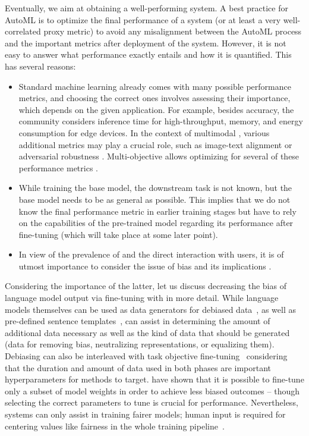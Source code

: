 Eventually, we aim at obtaining a well-performing \LLM system. A best practice for AutoML is to optimize the final performance of a system (or at least a very well-correlated proxy metric) to avoid any misalignment between the AutoML process and the important metrics after deployment of the system. However, it is not easy to answer what performance exactly entails and how it is quantified. This has several reasons: \begin{itemize}[(i)]
    \item Standard machine learning already comes with many possible performance metrics, and choosing the correct ones involves assessing their importance, which depends on the given application. For example, besides accuracy, the community considers inference time for high-throughput, memory, and energy consumption for edge devices. In the context of multimodal \LLMs, various additional metrics may play a crucial role, such as image-text alignment \cite{xu-cvpr18a, grimal-arxiv2023a} or adversarial robustness \cite{zhao-neurips23a}. Multi-objective \AutoML allows optimizing for several of these performance metrics \cite{moraleshernandez-arxiv21a,karl-evolearn23a}.
    \item While training the base model, the downstream task is not known, but the base model needs to be as general as possible. This implies that we do not know the final performance metric in earlier training stages but have to rely on the capabilities of the pre-trained model regarding its performance after fine-tuning (which will take place at some later point).
    \item In view of the prevalence of \LLMs and the direct interaction with users, it is of utmost importance to consider the issue of bias and its implications \cite{kumar-etal-2023-language}.
\end{itemize}

Considering the importance of the latter, let us discuss decreasing the bias of language model output via fine-tuning with \AutoML in more detail. While language models themselves can be used as data generators for debiased data~\cite{schick-tacl21,hernandez-arxiv23}, as well as pre-defined sentence templates~\cite{liang-acl20}, \AutoML can assist in determining the amount of additional data necessary as well as the kind of data that should be generated (data for removing bias, neutralizing representations, or equalizing them). 
Debiasing can also be interleaved with task objective fine-tuning~\cite{saravanan-arxiv23} considering that the duration and amount of data used in both phases are important hyperparameters for \AutoML methods to target.
\citet{gira-ltedi22} have shown that it is possible to fine-tune only a subset of model weights in order to achieve less biased outcomes -- though selecting the correct parameters to tune is crucial for performance.
Nevertheless, \AutoML systems can only assist in training fairer models; human input is required for centering values like fairness in the whole training pipeline~\cite{bender-facct21,weerts-arxiv23a}.


